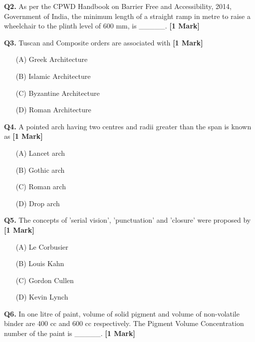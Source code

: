 \documentclass[11pt]{article}
\newcommand{\questiona}[2]{
    \noindent\textbf{Q#2.} #1 \hfill \textbf{[1 Mark]}
}
\begin{document}
\vspace{0.5cm}

\questiona{As per the CPWD Handbook on Barrier Free and Accessibility, 2014, Government of India, the minimum length of a straight ramp in metre to raise a wheelchair to the plinth level of 600 mm, is \_\_\_\_\_.}{2}

\vspace{0.5cm}

\questiona{Tuscan and Composite orders are associated with}{3}
\begin{enumerate}
    \item[(A)] Greek Architecture
    \item[(B)] Islamic Architecture  
    \item[(C)] Byzantine Architecture
    \item[(D)] Roman Architecture
\end{enumerate}

\vspace{0.5cm}

\questiona{A pointed arch having two centres and radii greater than the span is known as}{4}
\begin{enumerate}
    \item[(A)] Lancet arch
    \item[(B)] Gothic arch  
    \item[(C)] Roman arch
    \item[(D)] Drop arch
\end{enumerate}

\vspace{0.5cm}

\questiona{The concepts of 'serial vision', 'punctuation' and 'closure' were proposed by}{5}
\begin{enumerate}
    \item[(A)] Le Corbusier
    \item[(B)] Louis Kahn  
    \item[(C)] Gordon Cullen
    \item[(D)] Kevin Lynch
\end{enumerate}

\vspace{0.5cm}

\questiona{In one litre of paint, volume of solid pigment and volume of non-volatile binder are 400 cc and 600 cc respectively. The Pigment Volume Concentration number of the paint is \_\_\_\_\_.}{6}

\vspace{0.5cm}
\end{document}
